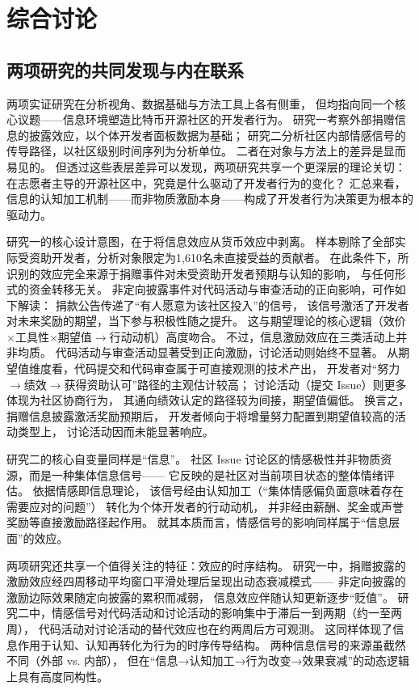 \chapter{综合讨论}

\section{两项研究的共同发现与内在联系}

两项实证研究在分析视角、数据基础与方法工具上各有侧重，
但均指向同一个核心议题——信息环境塑造比特币开源社区的开发者行为。
研究一考察外部捐赠信息的披露效应，以个体开发者面板数据为基础；
研究二分析社区内部情感信号的传导路径，以社区级别时间序列为分析单位。
二者在对象与方法上的差异是显而易见的。
但透过这些表层差异可以发现，两项研究共享一个更深层的理论关切：
在志愿者主导的开源社区中，究竟是什么驱动了开发者行为的变化？
汇总来看，信息的认知加工机制——而非物质激励本身——构成了开发者行为决策更为根本的驱动力。

研究一的核心设计意图，在于将信息效应从货币效应中剥离。
样本剔除了全部实际受资助开发者，分析对象限定为1,610名未直接受益的贡献者。
在此条件下，所识别的效应完全来源于捐赠事件对未受资助开发者预期与认知的影响，
与任何形式的资金转移无关。
非定向披露事件对代码活动与审查活动的正向影响，可作如下解读：
捐款公告传递了“有人愿意为该社区投入”的信号，
该信号激活了开发者对未来奖励的期望，当下参与积极性随之提升。
这与期望理论\cite{vroom1964work}的核心逻辑（效价$\times$工具性$\times$期望值$\to$行动动机）高度吻合。
不过，信息激励效应在三类活动上并非均质。
代码活动与审查活动显著受到正向激励，讨论活动则始终不显著。
从期望值维度看，代码提交和代码审查属于可直接观测的技术产出，
开发者对“努力$\to$绩效$\to$获得资助认可”路径的主观估计较高；
讨论活动（提交 Issue）则更多体现为社区协商行为，
其通向绩效认定的路径较为间接，期望值偏低。
换言之，捐赠信息披露激活奖励预期后，
开发者倾向于将增量努力配置到期望值较高的活动类型上，
讨论活动因而未能显著响应。

研究二的核心自变量同样是“信息”。
社区 Issue 讨论区的情感极性并非物质资源，而是一种集体信息信号——
它反映的是社区对当前项目状态的整体情绪评估。
依据情感即信息理论\cite{schwarz1983moods}，
该信号经由认知加工（“集体情感偏负面意味着存在需要应对的问题”）
转化为个体开发者的行动动机，
并非经由薪酬、奖金或声誉奖励等直接激励路径起作用。
就其本质而言，情感信号的影响同样属于“信息层面”的效应。

两项研究还共享一个值得关注的特征：效应的时序结构。
研究一中，捐赠披露的激励效应经四周移动平均窗口平滑处理后呈现出动态衰减模式——
非定向披露的激励边际效果随定向披露的累积而减弱，
信息效应伴随认知更新逐步“贬值”。
研究二中，情感信号对代码活动和讨论活动的影响集中于滞后一到两期（约一至两周），
代码活动对讨论活动的替代效应也在约两周后方可观测。
这同样体现了信息作用于认知、认知再转化为行为的时序传导结构。
两种信息信号的来源虽截然不同（外部 vs. 内部），
但在“信息→认知加工→行为改变→效果衰减”的动态逻辑上具有高度同构性。

